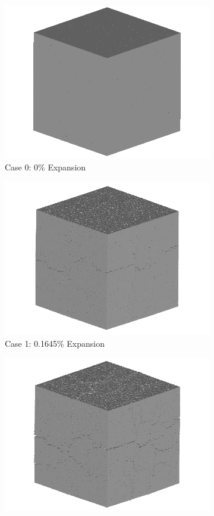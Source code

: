 \begin{figure}[!h]
\centering

    \begin{subfigure}{.5\textwidth}
      \centering
      \includegraphics[width=.8\linewidth]{Files/exp_3D/ASR/A30Undamaged.png} %
    \caption{Case 0: 0\% Expansion}
    \end{subfigure}%
    \begin{subfigure}{.5\textwidth}
      \centering
      \includegraphics[width=.8\linewidth]{Files/exp_3D/DEF/A15X0C_1_3d.png}
    \caption{Case 1: 0.1645\% Expansion}
    \end{subfigure}
    \begin{subfigure}{.5\textwidth}
      \centering
      \includegraphics[width=.8\linewidth]{Files/exp_3D/DEF/A15X0C_2_3d.png}

\end{subfigure}
\end{figure}
